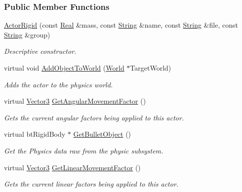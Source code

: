 \subsubsection*{Public Member Functions}
\begin{DoxyCompactItemize}
\item 
\hyperlink{classphys_1_1ActorRigid_a3005e81009d9b5b5bfb9a6f5068917d3}{ActorRigid} (const \hyperlink{namespacephys_af7eb897198d265b8e868f45240230d5f}{Real} \&mass, const \hyperlink{namespacephys_aa03900411993de7fbfec4789bc1d392e}{String} \&name, const \hyperlink{namespacephys_aa03900411993de7fbfec4789bc1d392e}{String} \&file, const \hyperlink{namespacephys_aa03900411993de7fbfec4789bc1d392e}{String} \&group)
\begin{DoxyCompactList}\small\item\em Descriptive constructor. \item\end{DoxyCompactList}\item 
virtual void \hyperlink{classphys_1_1ActorRigid_acaf29ca7058b39185dd09a5059200e91}{AddObjectToWorld} (\hyperlink{classphys_1_1World}{World} $\ast$TargetWorld)
\begin{DoxyCompactList}\small\item\em Adds the actor to the physics world. \item\end{DoxyCompactList}\item 
virtual \hyperlink{classphys_1_1Vector3}{Vector3} \hyperlink{classphys_1_1ActorRigid_a0d29535332ac613f9a14ea32e843d612}{GetAngularMovementFactor} ()
\begin{DoxyCompactList}\small\item\em Gets the current angular factors being applied to this actor. \item\end{DoxyCompactList}\item 
virtual btRigidBody $\ast$ \hyperlink{classphys_1_1ActorRigid_a9c8f1f4b99f41ab97050f5b15c802f14}{GetBulletObject} ()
\begin{DoxyCompactList}\small\item\em Get the Physics data raw from the physic subsystem. \item\end{DoxyCompactList}\item 
virtual \hyperlink{classphys_1_1Vector3}{Vector3} \hyperlink{classphys_1_1ActorRigid_ae29ab60e2c0e4762d2698c60b8df1d23}{GetLinearMovementFactor} ()
\begin{DoxyCompactList}\small\item\em Gets the current linear factors being applied to this actor. \item\end{DoxyCompactList}\item 

\end{DoxyCompactItemize}
